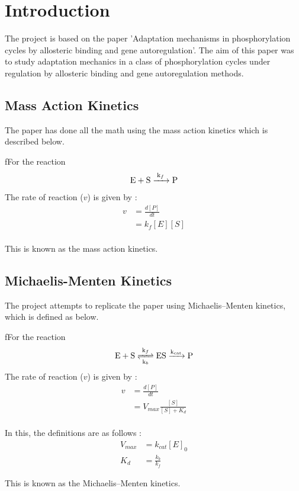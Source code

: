 \chapter*{Introduction}

The project is based on the paper 'Adaptation mechanisms 
in phosphorylation cycles by allosteric binding and gene 
autoregulation'. The aim of this paper was to study adaptation 
mechanics in a class of phosphorylation cycles under regulation 
by allosteric binding and gene autoregulation methods.

\section*{Mass Action Kinetics}
The paper has done all the math using the mass action kinetics 
which is described below.

\begin{definition}
    fFor the reaction $$\ce{E + S ->[k_f] P}$$
    The rate of reaction ($v$) is given by : 
    \begin{align*}
        v &= \frac{d[P]}{dt}\\
        &= k_f [E][S] 
    \end{align*}
\\
    This is known as the mass action kinetics.
\end{definition}

\section*{Michaelis-Menten Kinetics}

\noindent The project attempts to replicate the paper using 
Michaelis–Menten kinetics, which is defined as below.
\newpage
\begin{definition}
    fFor the reaction $$\ce{E + S <=>[k_f][k_b] ES ->[k_{cat}] P}$$
    The rate of reaction ($v$) is given by : 
    \begin{align*}
        v &= \frac{d[P]}{dt}\\
        &= V_{max} \frac{[S]}{[S] + K_d}
    \end{align*}
    \\

    In this, the definitions are as follows :
    \begin{align*}
        V_{max} &= k_{cat}[E]_0\\
        K_d &= \frac{k_b}{k_f}
    \end{align*}

    This is known as the Michaelis–Menten kinetics.
\end{definition}

